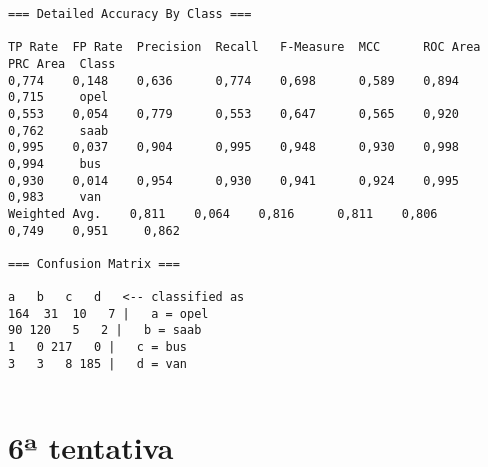 \documentclass[
	article,			%
	11pt,				%
	oneside,			%
	a4paper,			%
	english,			%
	brazil,				%
	sumario=tradicional
	]{abntex2}
\begin{document}
\begin{lstlisting}
=== Detailed Accuracy By Class ===

TP Rate  FP Rate  Precision  Recall   F-Measure  MCC      ROC Area  PRC Area  Class
0,774    0,148    0,636      0,774    0,698      0,589    0,894     0,715     opel
0,553    0,054    0,779      0,553    0,647      0,565    0,920     0,762     saab
0,995    0,037    0,904      0,995    0,948      0,930    0,998     0,994     bus
0,930    0,014    0,954      0,930    0,941      0,924    0,995     0,983     van
Weighted Avg.    0,811    0,064    0,816      0,811    0,806      0,749    0,951     0,862     

=== Confusion Matrix ===

a   b   c   d   <-- classified as
164  31  10   7 |   a = opel
90 120   5   2 |   b = saab
1   0 217   0 |   c = bus
3   3   8 185 |   d = van


\end{lstlisting}

\section{6ª tentativa}
\end{document}
